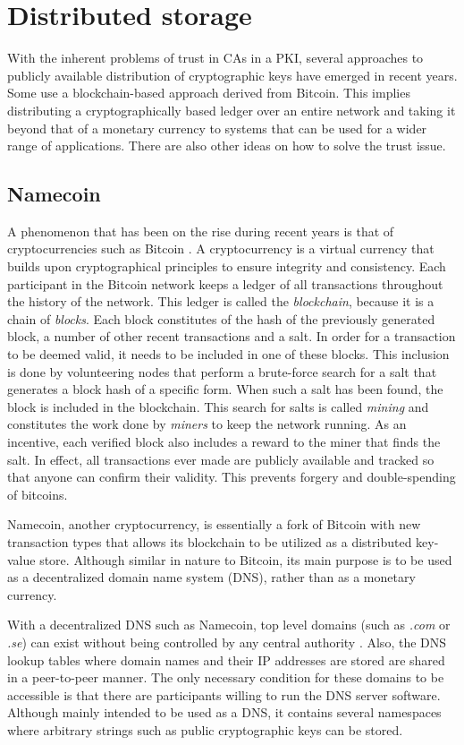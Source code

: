 \section{Distributed storage}
With the inherent problems of trust in CAs in a PKI, several approaches to publicly available distribution of cryptographic keys have emerged in recent years. Some use a blockchain-based approach derived from Bitcoin. This implies distributing a cryptographically based ledger over an entire network and taking it beyond that of a monetary currency to systems that can be used for a wider range of applications. There are also other ideas on how to solve the trust issue.

\subsection{Namecoin}
A phenomenon that has been on the rise during recent years is that of cryptocurrencies such as Bitcoin \cite{nakamoto:2009}. A cryptocurrency is a virtual currency that builds upon cryptographical principles to ensure integrity and consistency. Each participant in the Bitcoin network keeps a ledger of all transactions throughout the history of the network. This ledger is called the \emph{blockchain}, because it is a chain of \emph{blocks}. Each block constitutes of the hash of the previously generated block, a number of other recent transactions and a salt. In order for a transaction to be deemed valid, it needs to be included in one of these blocks. This inclusion is done by volunteering nodes that perform a brute-force search for a salt that generates a block hash of a specific form. When such a salt has been found, the block is included in the blockchain. This search for salts is called \emph{mining} and constitutes the work done by \emph{miners} to keep the network running. As an incentive, each verified block also includes a reward to the miner that finds the salt. In effect, all transactions ever made are publicly available and tracked so that anyone can confirm their validity. This prevents forgery and double-spending of bitcoins.

Namecoin\cite{Namecoin:Online}, another cryptocurrency, is essentially a fork of Bitcoin with new transaction types that allows its blockchain to be utilized as a distributed key-value store. Although similar in nature to Bitcoin, its main purpose is to be used as a decentralized domain name system (DNS), rather than as a monetary currency.

With a decentralized DNS such as Namecoin, top level domains (such as \emph{.com} or \emph{.se}) can exist without being controlled by any central authority \cite{Coindesk:2013:Online}. Also, the DNS lookup tables where domain names and their IP addresses are stored are shared in a peer-to-peer manner. The only necessary condition for these domains to be accessible is that there are participants willing to run the DNS server software. Although mainly intended to be used as a DNS, it contains several namespaces where arbitrary strings such as public cryptographic keys can be stored.

